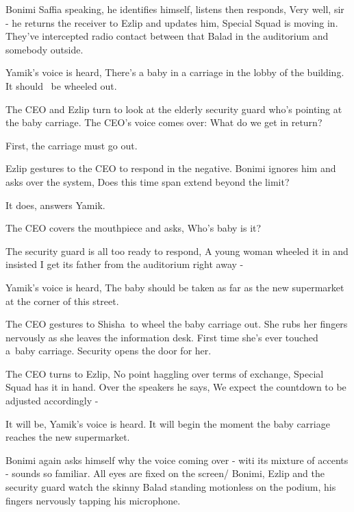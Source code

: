 \documentclass[letterpaper]{article}
\begin{document}
{\textquotedbl}Bonimi Saffia speaking,{\textquotedbl} he identifies himself, listens then responds, {\textquotedbl}Very
well, sir -{\textquotedbl} he returns the receiver to Ezlip and updates him, {\textquotedbl}Special Squad is moving in.
They've intercepted radio contact between that Balad in the auditorium and somebody outside.{\textquotedbl} 

Yamik's voice is heard, {\textquotedbl}There's a baby in a carriage in the lobby of the building. It should \ be wheeled
out.{\textquotedbl}

The CEO and Ezlip turn to look at the elderly security{ }guard who's pointing at
the baby carriage. The CEO's voice comes over: {\textquotedbl}What do we get in return?{\textquotedbl} 

{\textquotedbl}First, the carriage must go out.{\textquotedbl} 

Ezlip gestures to the CEO to respond in the negative. Bonimi ignores him and asks over the system, {\textquotedbl}Does
this time span extend beyond the limit?{\textquotedbl}

{\textquotedbl}It does,{\textquotedbl} answers Yamik{.}

The CEO covers the mouthpiece and asks, {\textquotedbl}Who's baby is it?{\textquotedbl} 

The security guard is all too ready to respond, {\textquotedbl}A young{ }woman
wheeled it in and insisted I get its father from the auditorium right away -{\textquotedbl} 

Yamik's voice is heard, {\textquotedbl}The baby should be taken as far as the new supermarket at the corner of this
street.{\textquotedbl}

The CEO gestures to Shisha~to wheel the baby carriage out. She rubs her fingers nervously as she leaves the information
desk. First time she's ever touched a~baby carriage. Security opens the door for her.

The CEO turns to Ezlip, {\textquotedbl}No point haggling over terms of exchange, Special Squad has it in
hand.{\textquotedbl} Over the speakers he says, {\textquotedbl}We expect the countdown to be adjusted accordingly
-{\textquotedbl} 

{\textquotedbl}It will be,{\textquotedbl} Yamik's voice is heard.{\textquotedbl} It will begin the moment the baby
carriage reaches{ }the new supermarket.{\textquotedbl} 

Bonimi again asks himself why the voice coming over - witi its mixture of accents - sounds
so{ }familiar. All eyes are fixed on the
screen{/ }Bonimi, Ezlip and the security guard watch the skinny Balad standing
motionless on the podium, his fingers nervously tapping his microphone.
\end{document}
